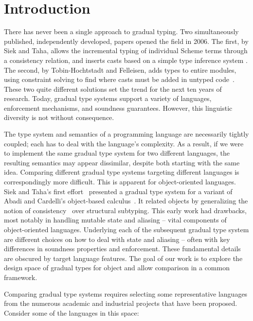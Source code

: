 \documentclass[a4paper,USenglish]{tex/lipics-v2016}
\begin{document}
\section{Introduction}


\noindent There has never been a single approach to gradual typing.  Two
simultaneously published, independently developed, papers opened the field
in 2006. The first, by Siek and Taha, allows the incremental typing of
individual Scheme terms through a consistency relation, and inserts casts
based on a simple type inference system \cite{SiekTaha06}. The second, by
Tobin-Hochtstadt and Felleisen, adds types to entire modules, using
constraint solving to find where casts must be added in untyped
code~\cite{tf-dls06}. These two quite different solutions set the trend for
the next ten years of research. Today, gradual type systems support a
variety of languages, enforcement mechanisms, and soundness
guarantees. However, this linguistic diversity is not without consequence.

The type system and semantics of a programming language are necessarily
tightly coupled; each has to deal with the language's complexity. As a
result, if we were to implement the same gradual type system for two
different languages, the resulting semantics may appear dissimilar, despite
both starting with the same idea. Comparing different gradual type systems
targeting different languages is correspondingly more difficult.  This is
apparent for object-oriented languages. Siek and Taha's first
effort~\cite{SiekTaha07} presented a gradual type system for a variant of
Abadi and Cardelli's object-based
calculus~\cite{cardelli:1996:theory-of-objects}. It related objects by
generalizing the notion of consistency~\cite{SiekTaha06} over structural
subtyping. This early work had drawbacks, most notably in handling mutable
state and aliasing -- vital components of object-oriented languages.
Underlying each of the subsequent gradual type system are different choices
on how to deal with state and aliasing -- often with key differences in
soundness properties and enforcement. These fundamental details are obscured
by target language features. The goal of our work is to explore the design
space of gradual types for object and allow comparison in a common
framework.


Comparing gradual type systems requires selecting some representative
languages from the numerous academic and industrial projects that
have been proposed. Consider some of the languages in this space:
\end{document}
